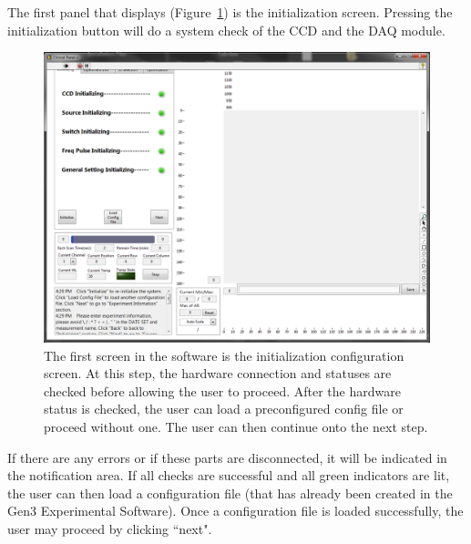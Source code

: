 The first panel that displays (Figure~\ref{fig:Clinical2}) is the initialization screen. Pressing the initialization button will do a system check of the CCD and the DAQ module.
\vspace{2mm}
\begin{figure}[bh]
\centering
\includegraphics[width=13.5cm]{./figures/A_Gen3Software/Clinical2.png}
\caption[Initialization panel in the clinical software]{The first screen in the software is the initialization configuration screen. At this step, the hardware connection and statuses are checked before allowing the user to proceed. After the hardware status is checked, the user can load a preconfigured config file or proceed without one. The user can then continue onto the next step.}
\label{fig:Clinical2}
\end{figure}
If there are any errors or if these parts are disconnected, it will be indicated in the notification area. If all checks are successful and all green indicators are lit, the user can then load a configuration file (that has already been created in the Gen3 Experimental Software). Once a configuration file is loaded successfully, the user may proceed by clicking ``next". 

